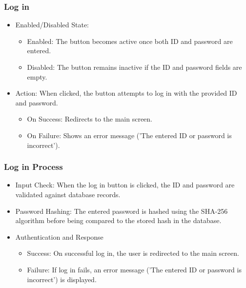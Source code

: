 \documentclass[conference]{IEEEtran}
\begin{document}
\subsubsection{Log in}
\begin{itemize}
    \item Enabled/Disabled State:
\begin{itemize}
    \item Enabled: The button becomes active once both ID and password are entered.\\
    \item Disabled: The button remains inactive if the ID and password fields are empty.\\
\end{itemize}
\end{itemize}
\begin{itemize}
    \item Action: When clicked, the button attempts to log in with the provided ID and password.
\begin{itemize}
    \item On Success: Redirects to the main screen.\\
    \item On Failure: Shows an error message ('The entered ID or password is incorrect').\\
\end{itemize}
\end{itemize}


\subsubsection{Log in Process}
\begin{itemize}
    \item Input Check: When the log in button is clicked, the ID and password are validated against database records.\\
    \item Password Hashing: The entered password is hashed using the SHA-256 algorithm before being compared to the stored hash in the database.\\
    \item Authentication and Response
\begin{itemize}
    \item Success: On successful log in, the user is redirected to the main screen.\\
    \item Failure: If log in fails, an error message ('The entered ID or password is incorrect') is displayed.\\
\end{itemize}
\end{itemize}
\end{document}

